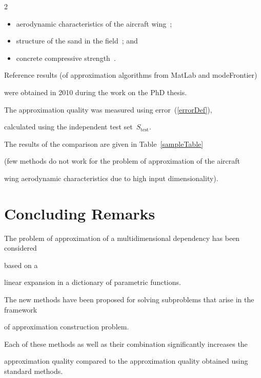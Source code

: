 \begin{multicols}{2}
\begin{itemize}
  \item aerodynamic characteristics of the aircraft wing~\cite{quadpal};

  \item structure of the sand in the field~\cite{icfault}; and

  \item concrete compressive strength~\cite{concrete}.

\end{itemize}

Reference results (of approximation algorithms from MatLab and modeFrontier)

were obtained in 2010 during the work on the PhD thesis.

The approximation quality was measured using error~(\ref{errorDef}), 

calculated using the independent test set~$S_{\mathrm{test}}$.

The results of the comparison are given in Table~\ref{sampleTable} 

  (few methods do not work for the problem of approximation of the aircraft

  wing aerodynamic characteristics due to high input dimensionality).

  {

  

  }







\section{Concluding Remarks}



\noindent

The problem of approximation of a multidimensional dependency has been considered

based on a

linear expansion in a dictionary of parametric functions.

The new methods have been proposed for solving subproblems that arise in the framework 

of approximation construction problem.

Each of these methods as well as their combination significantly increases the

approximation quality compared to the approximation quality obtained using standard methods.


\end{multicols}
